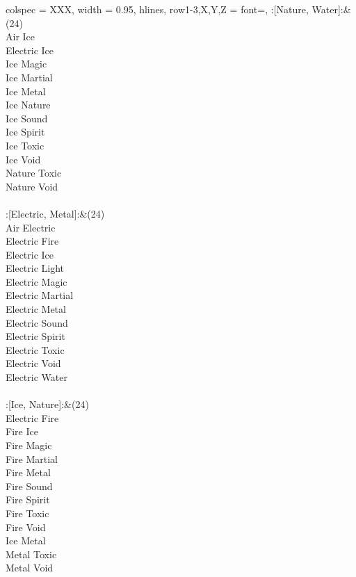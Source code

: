 \begin{longtblr}[
	caption = {2v2 Attacking Ineffective},
	label = {2v2-Attacking-Ineffective},
]{
	colspec = {XXX}, width = 0.95\linewidth,
	hlines,
	row{1-3,X,Y,Z} = {font=\bfseries},
}
	:[Nature, Water]:&{(24)\\
	Air Ice \\
	Electric Ice \\
	Ice Magic \\
	Ice Martial \\
	Ice Metal \\
	Ice Nature \\
	Ice Sound \\
	Ice Spirit \\
	Ice Toxic \\
	Ice Void \\
	Nature Toxic \\
	Nature Void \\
	}\\

	:[Electric, Metal]:&{(24)\\
	Air Electric \\
	Electric Fire \\
	Electric Ice \\
	Electric Light \\
	Electric Magic \\
	Electric Martial \\
	Electric Metal \\
	Electric Sound \\
	Electric Spirit \\
	Electric Toxic \\
	Electric Void \\
	Electric Water \\
	}\\

	:[Ice, Nature]:&{(24)\\
	Electric Fire \\
	Fire Ice \\
	Fire Magic \\
	Fire Martial \\
	Fire Metal \\
	Fire Sound \\
	Fire Spirit \\
	Fire Toxic \\
	Fire Void \\
	Ice Metal \\
	Metal Toxic \\
	Metal Void \\
	}\\


\end{longtblr}
